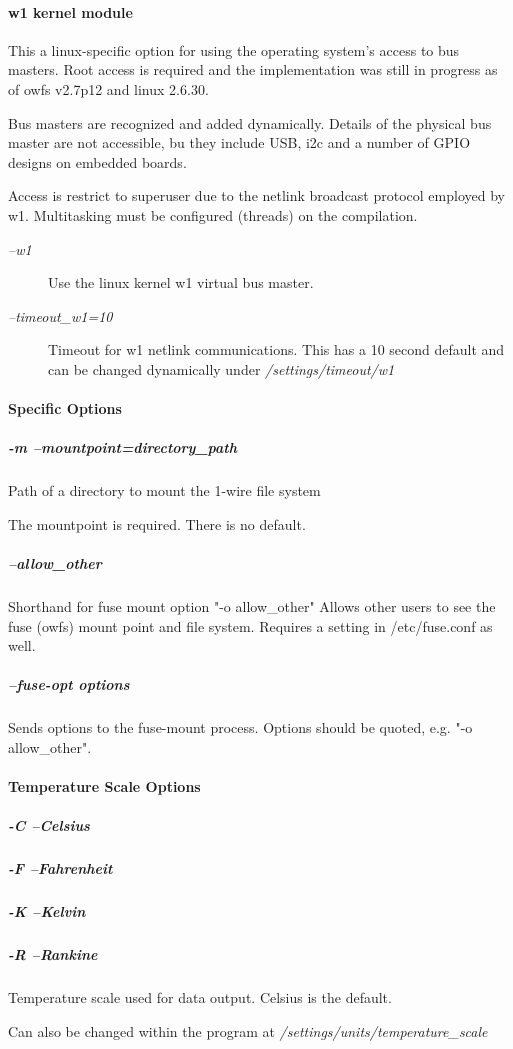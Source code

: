 \paragraph*{ w1 kernel module}
This a linux-specific
option for using the operating system's access to bus masters. Root access
is required and the implementation was still in progress as of owfs v2.7p12
and linux 2.6.30. 

Bus masters are recognized and added dynamically. Details
of the physical bus master are not accessible, bu they include USB, i2c
and a number of GPIO designs on embedded boards. 

Access is restrict to superuser
due to the netlink broadcast protocol employed by w1. Multitasking must
be configured (threads) on the compilation. \begin{description}
\item [\textit{--w1} ] Use the linux kernel w1 virtual
bus master. 
\item [\textit{--timeout\_w1=10} ] Timeout for w1 netlink communications. This has
a 10 second default and can be changed dynamically under \textit{/settings/timeout/w1}
 
\end{description}

\paragraph*{Specific Options}

\subparagraph*{-m --mountpoint=directory\_path}Path of a directory to mount
the 1-wire file system 

The mountpoint is required. There is no default. 
\subparagraph*{--allow\_other}Shorthand
for fuse mount option "-o allow\_other"  Allows other users to see the fuse
(owfs) mount point and file system. Requires a setting in /etc/fuse.conf
as well. 
\subparagraph*{--fuse-opt \dq{}options\dq{}}Sends options to the fuse-mount process. Options
should be quoted, e.g. "-o allow\_other".
\paragraph*{Temperature Scale Options}

\subparagraph*{-C --Celsius}
\subparagraph*{-F --Fahrenheit}
\subparagraph*{-K
--Kelvin}
\subparagraph*{-R --Rankine}Temperature scale used for data output. Celsius is the default.


Can also be changed within the program at \textit{/settings/units/temperature\_scale}
           
